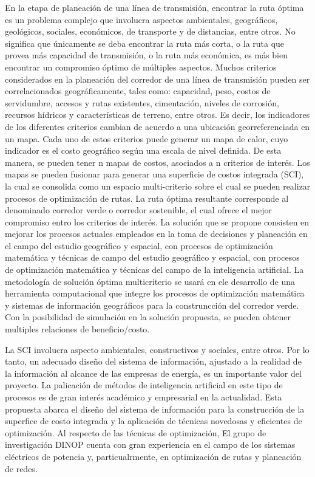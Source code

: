 \documentclass[
  letterpaper,
  DIV=11,
  numbers=noendperiod]{scrartcl}
\begin{document}
En la etapa de planeación de una línea de transmisión, encontrar la ruta
óptima es un problema complejo que involucra aspectos ambientales,
geográficos, geológicos, sociales, económicos, de transporte y de
distancias, entre otros. No significa que únicamente se deba encontrar
la ruta más corta, o la ruta que provea más capacidad de transmisión, o
la ruta más económica, es más bien encontrar un compromiso óptimo de
múltiples aspectos. Muchos criterios considerados en la planeación del
corredor de una línea de transmisión pueden ser correlacionados
geográficamente, tales como: capacidad, peso, costos de servidumbre,
accesos y rutas existentes, cimentación, niveles de corrosión, recursos
hídricos y características de terreno, entre otros. Es decir, los
indicadores de los diferentes criterios cambian de acuerdo a una
ubicación georreferenciada en un mapa. Cada uno de estos criterios puede
generar un mapa de calor, cuyo indicador es el costo geográfico según
una escala de nivel definida. De esta manera, se pueden tener n mapas de
costos, asociados a n criterios de interés. Los mapas se pueden fusionar
para generar una superficie de costos integrada (SCI), la cual se
consolida como un espacio multi-criterio sobre el cual se pueden
realizar procesos de optimización de rutas. La ruta óptima resultante
corresponde al denominado corredor verde o corredor sostenible, el cual
ofrece el mejor compromiso entro los criterios de interés. La solución
que se propone consisten en mejorar los procesos actuales empleados en
la toma de decisiones y planeación en el campo del estudio geográfico y
espacial, con procesos de optimización matemática y técnicas de campo
del estudio geográfico y espacial, con procesos de optimización
matemática y técnicas del campo de la inteligencia artificial. La
metodología de solución óptima multicriterio se usará en ele desarrollo
de una herramienta computacional que integre los procesos de
optimización matemática y sistemas de información geográficos para la
construncción del corredor verde. Con la posibilidad de simulación en la
solución propuesta, se pueden obtener multiples relaciones de
beneficio/costo.

La SCI involucra aspecto ambientales, constructivos y sociales, entre
otros. Por lo tanto, un adecuado diseño del sistema de información,
ajustado a la realidad de la información al alcance de las empresas de
energía, es un importante valor del proyecto. La palicación de métodos
de inteligencia artificial en este tipo de procesos es de gran interés
académico y empresarial en la actualidad. Esta propuesta abarca el
diseño del sistema de información para la construcción de la superfice
de costo integrada y la aplicación de técnicas novedosas y eficientes de
optimización. Al respecto de las técnicas de optimización, El grupo de
investigación DINOP cuenta con gran experiencia en el campo de los
sistemas eléctricos de potencia y, particualrmente, en optimización de
rutas y planeación de redes.
\end{document}
